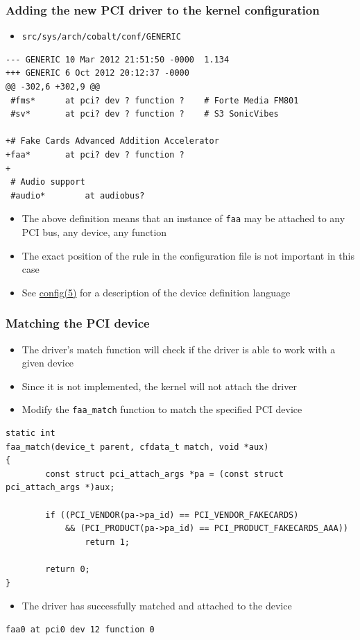 \documentclass[dvipsnames,table]{beamer}
\begin{document}
\begin{frame}[fragile]
\frametitle{Adding the new PCI driver to the kernel configuration}
\scriptsize
\begin{itemize}
	\item {\tt src/sys/arch/cobalt/conf/GENERIC}
\end{itemize}
\begin{verbatim}
--- GENERIC	10 Mar 2012 21:51:50 -0000	1.134
+++ GENERIC	6 Oct 2012 20:12:37 -0000
@@ -302,6 +302,9 @@
 #fms*		at pci? dev ? function ?	# Forte Media FM801
 #sv*		at pci? dev ? function ?	# S3 SonicVibes
 
+# Fake Cards Advanced Addition Accelerator
+faa*		at pci? dev ? function ?
+
 # Audio support
 #audio*		at audiobus?
\end{verbatim}
\normalsize
\begin{itemize}
	\item The above definition means that an instance of {\tt faa} may be attached to any PCI bus, any device, any function
	\item The exact position of the rule in the configuration file is not important in this case
	\item See \href{http://netbsd.gw.com/cgi-bin/man-cgi?config+5+NetBSD-current}{config(5)} for a description of the device definition language
\end{itemize}
\end{frame}

\begin{frame}[fragile]
\frametitle{Matching the PCI device}
\begin{itemize}
	\item The driver's match function will check if the driver is able to work with a given device
 	\item Since it is not implemented, the kernel will not attach the driver
	\item Modify the {\tt faa\_match} function to match the specified PCI device
\end{itemize}
\scriptsize
\begin{lstlisting}
static int
faa_match(device_t parent, cfdata_t match, void *aux)
{
        const struct pci_attach_args *pa = (const struct pci_attach_args *)aux;

        if ((PCI_VENDOR(pa->pa_id) == PCI_VENDOR_FAKECARDS) 
            && (PCI_PRODUCT(pa->pa_id) == PCI_PRODUCT_FAKECARDS_AAA))
                return 1;

        return 0;
}
\end{lstlisting}
\normalsize
\begin{itemize}
	\item The driver has successfully matched and attached to the device
\end{itemize}
\begin{verbatim}
faa0 at pci0 dev 12 function 0
\end{verbatim}
\end{frame}
\end{document}
